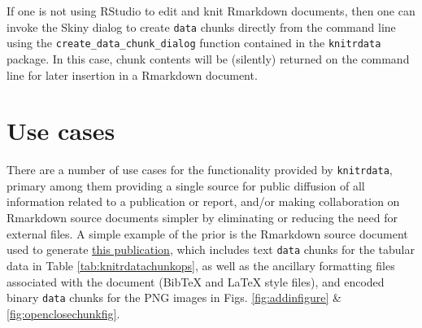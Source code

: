 If one is not using RStudio to edit and knit Rmarkdown documents, then one can invoke the Skiny dialog to create \texttt{data} chunks directly from the command line using the \texttt{create\_data\_chunk\_dialog} function contained in the \texttt{knitrdata} package. In this case, chunk contents will be (silently) returned on the command line for later insertion in a Rmarkdown document.

\hypertarget{use-cases}{%
\section{Use cases}\label{use-cases}}

There are a number of use cases for the functionality provided by \texttt{knitrdata}, primary among them providing a single source for public diffusion of all information related to a publication or report, and/or making collaboration on Rmarkdown source documents simpler by eliminating or reducing the need for external files. A simple example of the prior is the Rmarkdown source document used to generate \href{https://github.com/dmkaplan2000/knitrdata_examples/blob/e5f59b7475a542bef41c60e8ee6652f656c9e377/2020-knitrdata.Rmd}{this publication}, which includes text \texttt{data} chunks for the tabular data in Table \ref{tab:knitrdatachunkops}, as well as the ancillary formatting files associated with the document (BibTeX and LaTeX style files), and encoded binary \texttt{data} chunks for the PNG images in Figs. \ref{fig:addinfigure} \& \ref{fig:openclosechunkfig}.


